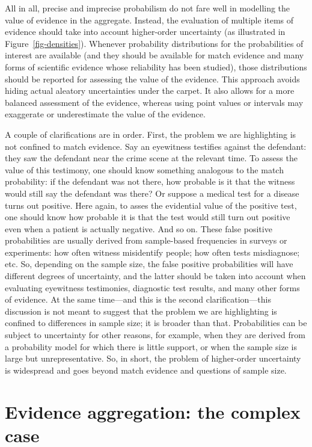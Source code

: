 \documentclass[
  letterpaper,
  DIV=11,
  numbers=noendperiod]{scrartcl}
\begin{document}
All in all, precise and imprecise probabilism do not fare well in
modelling the value of evidence in the aggregate. Instead, the
evaluation of multiple items of evidence should take into account
higher-order uncertainty (as illustrated in Figure~\ref{fig-densities}).
Whenever probability distributions for the probabilities of interest are
available (and they should be available for match evidence and many
forms of scientific evidence whose reliability has been studied), those
distributions should be reported for assessing the value of the
evidence. This approach avoids hiding actual aleatory uncertainties
under the carpet. It also allows for a more balanced assessment of the
evidence, whereas using point values or intervals may exaggerate or
underestimate the value of the evidence.

A couple of clarifications are in order. First, the problem we are
highlighting is not confined to match evidence. Say an eyewitness
testifies against the defendant: they saw the defendant near the crime
scene at the relevant time. To assess the value of this testimony, one
should know something analogous to the match probability: if the
defendant was not there, how probable is it that the witness would still
say the defendant was there? Or suppose a medical test for a disease
turns out positive. Here again, to asses the evidential value of the
positive test, one should know how probable it is that the test would
still turn out positive even when a patient is actually negative. And so
on. These false positive probabilities are usually derived from
sample-based frequencies in surveys or experiments: how often witness
misidentify people; how often tests misdiagnose; etc. So, depending on
the sample size, the false positive probabilities will have different
degrees of uncertainty, and the latter should be taken into account when
evaluating eyewitness testimonies, diagnostic test results, and many
other forms of evidence. At the same time---and this is the second
clarification---this discussion is not meant to suggest that the problem
we are highlighting is confined to differences in sample size; it is
broader than that. Probabilities can be subject to uncertainty for other
reasons, for example, when they are derived from a probability model for
which there is little support, or when the sample size is large but
unrepresentative. So, in short, the problem of higher-order uncertainty
is widespread and goes beyond match evidence and questions of sample
size.

\hypertarget{evidence-aggregation-the-complex-case}{%
\section{Evidence aggregation: the complex
case}\label{evidence-aggregation-the-complex-case}}
\end{document}
